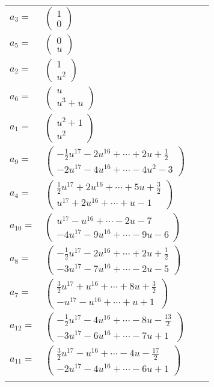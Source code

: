 \documentclass[1p]{elsarticle_modified}
\theoremstyle{definition}
\begin{document}
\begin{tabular}{m{7pt} m{180pt} m{7pt} m{180pt} }
\flushright $a_{3}=$&$\begin{pmatrix}1\\0\end{pmatrix}$ \\
\flushright $a_{5}=$&$\begin{pmatrix}0\\u\end{pmatrix}$ \\
\flushright $a_{2}=$&$\begin{pmatrix}1\\u^2\end{pmatrix}$ \\
\flushright $a_{6}=$&$\begin{pmatrix}u\\u^3+u\end{pmatrix}$ \\
\flushright $a_{1}=$&$\begin{pmatrix}u^2+1\\u^2\end{pmatrix}$ \\
\flushright $a_{9}=$&$\begin{pmatrix}-\frac{1}{2} u^{17}-2 u^{16}+\cdots+2 u+\frac{1}{2}\\-2 u^{17}-4 u^{16}+\cdots-4 u^2-3\end{pmatrix}$ \\
\flushright $a_{4}=$&$\begin{pmatrix}\frac{1}{2} u^{17}+2 u^{16}+\cdots+5 u+\frac{3}{2}\\u^{17}+2 u^{16}+\cdots+u-1\end{pmatrix}$ \\
\flushright $a_{10}=$&$\begin{pmatrix}u^{17}- u^{16}+\cdots-2 u-7\\-4 u^{17}-9 u^{16}+\cdots-9 u-6\end{pmatrix}$ \\
\flushright $a_{8}=$&$\begin{pmatrix}-\frac{1}{2} u^{17}-2 u^{16}+\cdots+2 u+\frac{1}{2}\\-3 u^{17}-7 u^{16}+\cdots-2 u-5\end{pmatrix}$ \\
\flushright $a_{7}=$&$\begin{pmatrix}\frac{3}{2} u^{17}+u^{16}+\cdots+8 u+\frac{3}{2}\\- u^{17}- u^{16}+\cdots+u+1\end{pmatrix}$ \\
\flushright $a_{12}=$&$\begin{pmatrix}-\frac{1}{2} u^{17}-4 u^{16}+\cdots-8 u-\frac{13}{2}\\-3 u^{17}-6 u^{16}+\cdots-7 u+1\end{pmatrix}$ \\
\flushright $a_{11}=$&$\begin{pmatrix}\frac{3}{2} u^{17}- u^{16}+\cdots-4 u-\frac{17}{2}\\-2 u^{17}-4 u^{16}+\cdots-6 u+1\end{pmatrix}$\\&\end{tabular}
\end{document}

